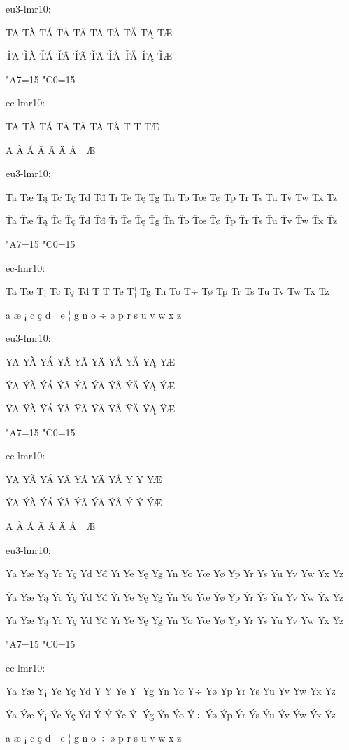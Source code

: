eu3-lmr10:

TA TÀ TÁ TÂ TÃ TÄ TÅ TĂ TĄ TÆ

ŤA ŤÀ ŤÁ ŤÂ ŤÃ ŤÄ ŤÅ ŤĂ ŤĄ ŤÆ

{
\eclmr
\kcatcode"A7=15
\kcatcode"C0=15

ec-lmr10:

TA T^^c0 T^^c1 T^^c2 T^^c3 T^^c4 T^^c5 T^^80 T^^81 T^^c6

^^94A ^^94^^c0 ^^94^^c1 ^^94^^c2 ^^94^^c3 ^^94^^c4 ^^94^^c5 ^^94^^80 ^^94^^81 ^^94^^c6
}

eu3-lmr10:

Ta Tæ Tą Tc Tç Td Tđ Tı Te Tę Tg Tn To Tœ Tø Tp Tr Ts Tu Tv Tw Tx Tz

Ťa Ťæ Ťą Ťc Ťç Ťd Ťđ Ťı Ťe Ťę Ťg Ťn Ťo Ťœ Ťø Ťp Ťr Ťs Ťu Ťv Ťw Ťx Ťz

{
\eclmr
\kcatcode"A7=15
\kcatcode"C0=15

ec-lmr10:

Ta T^^e6 T^^a1 Tc T^^e7 Td T^^9e T^^19 Te T^^a6 Tg Tn To T^^f7 T^^f8 Tp Tr Ts Tu Tv Tw Tx Tz

^^94a ^^94^^e6 ^^94^^a1 ^^94c ^^94^^e7 ^^94d ^^94^^9e ^^94^^19 ^^94e ^^94^^a6 ^^94g ^^94n ^^94o ^^94^^f7 ^^94^^f8 ^^94p ^^94r ^^94s ^^94u ^^94v ^^94w ^^94x ^^94z
}

eu3-lmr10:

YA YÀ YÁ YÂ YÃ YÄ YÅ YĂ YĄ YÆ

ÝA ÝÀ ÝÁ ÝÂ ÝÃ ÝÄ ÝÅ ÝĂ ÝĄ ÝÆ

ŸA ŸÀ ŸÁ ŸÂ ŸÃ ŸÄ ŸÅ ŸĂ ŸĄ ŸÆ

{
\eclmr
\kcatcode"A7=15
\kcatcode"C0=15

ec-lmr10:

YA Y^^c0 Y^^c1 Y^^c2 Y^^c3 Y^^c4 Y^^c5 Y^^80 Y^^81 Y^^c6

^^ddA ^^dd^^c0 ^^dd^^c1 ^^dd^^c2 ^^dd^^c3 ^^dd^^c4 ^^dd^^c5 ^^dd^^80 ^^dd^^81 ^^dd^^c6

^^98A ^^98^^c0 ^^98^^c1 ^^98^^c2 ^^98^^c3 ^^98^^c4 ^^98^^c5 ^^98^^80 ^^98^^81 ^^98^^c6
}

eu3-lmr10:

Ya Yæ Yą Yc Yç Yd Yđ Yı Ye Yę Yg Yn Yo Yœ Yø Yp Yr Ys Yu Yv Yw Yx Yz

Ýa Ýæ Ýą Ýc Ýç Ýd Ýđ Ýı Ýe Ýę Ýg Ýn Ýo Ýœ Ýø Ýp Ýr Ýs Ýu Ýv Ýw Ýx Ýz

Ÿa Ÿæ Ÿą Ÿc Ÿç Ÿd Ÿđ Ÿı Ÿe Ÿę Ÿg Ÿn Ÿo Ÿœ Ÿø Ÿp Ÿr Ÿs Ÿu Ÿv Ÿw Ÿx Ÿz

{
\eclmr
\kcatcode"A7=15
\kcatcode"C0=15

ec-lmr10:

Ya Y^^e6 Y^^a1 Yc Y^^e7 Yd Y^^9e Y^^19 Ye Y^^a6 Yg Yn Yo Y^^f7 Y^^f8 Yp Yr Ys Yu Yv Yw Yx Yz

^^dda ^^dd^^e6 ^^dd^^a1 ^^ddc ^^dd^^e7 ^^ddd ^^dd^^9e ^^dd^^19 ^^dde ^^dd^^a6 ^^ddg ^^ddn ^^ddo ^^dd^^f7 ^^dd^^f8 ^^ddp ^^ddr ^^dds ^^ddu ^^ddv ^^ddw ^^ddx ^^ddz

^^98a ^^98^^e6 ^^98^^a1 ^^98c ^^98^^e7 ^^98d ^^98^^9e ^^98^^19 ^^98e ^^98^^a6 ^^98g ^^98n ^^98o ^^98^^f7 ^^98^^f8 ^^98p ^^98r ^^98s ^^98u ^^98v ^^98w ^^98x ^^98z
}

